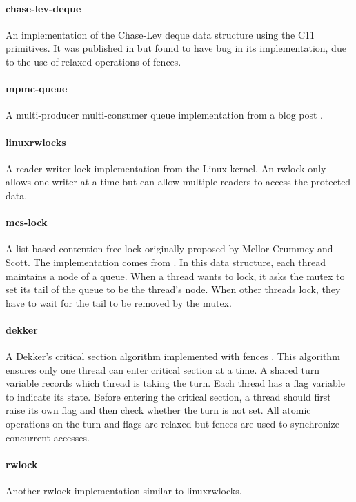 \paragraph{chase-lev-deque} An implementation of the Chase-Lev deque data structure using the C11 primitives. It was published in \cite{chase-lev-deque-impl} but found to have bug in its implementation, due to the use of relaxed operations of fences.

\paragraph{mpmc-queue} A multi-producer multi-consumer queue implementation from a blog post \cite{mpmc-queue-impl}.

\paragraph{linuxrwlocks} A reader-writer lock implementation from the Linux kernel. An rwlock only allows one writer at a time but can allow multiple readers to access the protected data.


\paragraph{mcs-lock} A list-based contention-free lock originally proposed by Mellor-Crummey and Scott\cite{mcs-lock}. The implementation comes from \cite{mcs-lock-impl}. In this data structure, each thread maintains a node of a queue. When a thread wants to lock, it asks the mutex to set its tail of the queue to be the thread's node. When other threads lock, they have to wait for the tail to be removed by the mutex.

\paragraph{dekker} A Dekker's critical section algorithm implemented with fences \cite{dekker-fence-impl}. This algorithm ensures only one thread can enter critical section at a time. A shared turn variable records which thread is taking the turn. Each thread has a flag variable to indicate its state. Before entering the critical section, a thread should first raise its own flag and then check whether the turn is not set. All atomic operations on the turn and flags are relaxed but fences are used to synchronize concurrent accesses.

\paragraph{rwlock} Another rwlock implementation similar to linuxrwlocks.
